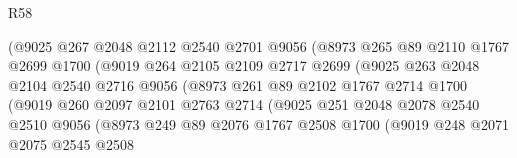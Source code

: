 \begin{lexlean}{R58}
\begin{coremodule}
                            (@9025
                              @267
                              @2048
                              @2112
                              @2540
                              @2701
                              @9056
                              (@8973
                                @265
                                @89
                                @2110
                                @1767
                                @2699
                                @1700
                                (@9019
                                  @264
                                  @2105
                                  @2109
                                  @2717
                                  @2699
                                  (@9025
                                    @263
                                    @2048
                                    @2104
                                    @2540
                                    @2716
                                    @9056
                                    (@8973
                                      @261
                                      @89
                                      @2102
                                      @1767
                                      @2714
                                      @1700
                                      (@9019
                                        @260
                                        @2097
                                        @2101
                                        @2763
                                        @2714
                                        (@9025
                                          @251
                                          @2048
                                          @2078
                                          @2540
                                          @2510
                                          @9056
                                          (@8973
                                            @249
                                            @89
                                            @2076
                                            @1767
                                            @2508
                                            @1700
                                            (@9019
                                              @248
                                              @2071
                                              @2075
                                              @2545
                                              @2508

\end{coremodule}
\end{lexlean}
